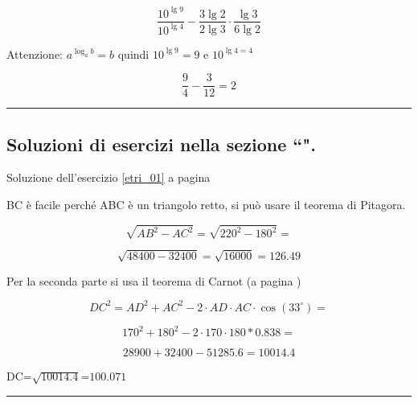 \begin{equation*}
\frac{10^{\lg9}}{10^{\lg4}}-\frac{3\lg2}{2\lg3}\cdot\frac{\lg3}{6\lg2}
\end{equation*}

Attenzione: $a^{\log_ab}=b$ quindi $10^{\lg9}=9$ e $10^{\lg4=4}$

\begin{equation*}
\frac{9}{4}-\frac{3}{12}=2
\end{equation*}



\vspace{1cm}
\hrule
\vspace{1cm}

\subsection{Soluzioni di esercizi nella sezione ``\textbf{}".}



Soluzione dell'esercizio \ref{etri_01} a pagina \pageref{etri_01}\label{stri_01}

BC è facile perché ABC è un triangolo retto, si può usare il teorema di Pitagora.


\begin{equation*}
\sqrt{{AB}^2-{AC}^2}=
\sqrt{{220}^2-{180}^2}=
\end{equation*}

\begin{equation*}
\sqrt{48400 - 32400}=\sqrt{16000}=126.49
\end{equation*}

Per la seconda parte si usa il teorema di Carnot (a pagina \pageref{subs_carnot})

\begin{equation*}
DC^2=AD^2+AC^2-2\cdot AD\cdot AC\cdot \cos(33^\circ)=
\end{equation*}

\begin{equation*}
170^2+180^2-2\cdot 170\cdot 180 * 0.838=
\end{equation*}

\begin{equation*}
28900+32400-51285.6=10014.4
\end{equation*}

DC=$\sqrt{10014.4}$=$100.071$

\vspace{1cm}
\hrule
\vspace{1cm}

